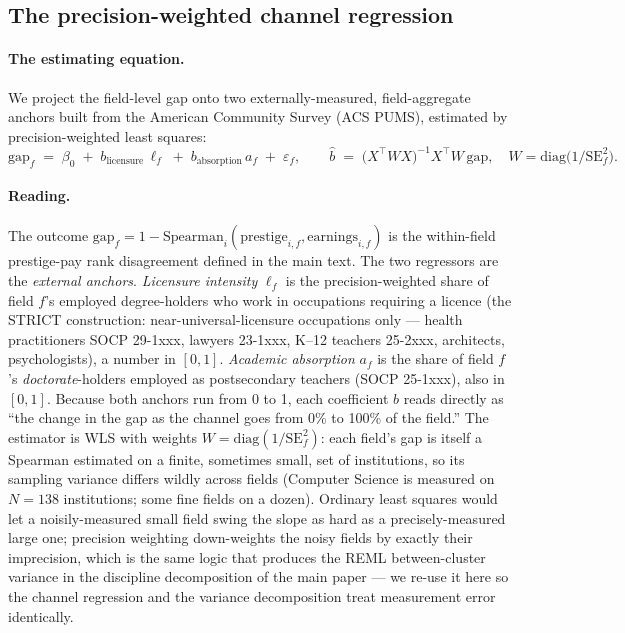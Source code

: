 \documentclass[11pt]{article}
\begin{document}
\subsection{The precision-weighted channel regression}

\paragraph{The estimating equation.} We project the field-level gap onto two externally-measured, field-aggregate anchors built from the American Community Survey (ACS PUMS), estimated by precision-weighted least squares:
\[
\mathrm{gap}_f \;=\; \beta_0 \;+\; b_{\text{licensure}}\,\ell_f \;+\; b_{\text{absorption}}\,a_f \;+\; \varepsilon_f,
\qquad
\widehat{b} \;=\; \big(X^\top W X\big)^{-1} X^\top W\,\mathrm{gap},
\quad
W = \mathrm{diag}\!\big(1/\mathrm{SE}_f^2\big).
\]

\paragraph{Reading.} The outcome $\mathrm{gap}_f = 1 - \mathrm{Spearman}_i(\text{prestige}_{i,f},\text{earnings}_{i,f})$ is the within-field prestige-pay rank disagreement defined in the main text. The two regressors are the \emph{external anchors}. \emph{Licensure intensity} $\ell_f$ is the precision-weighted share of field $f$'s employed degree-holders who work in occupations requiring a licence (the STRICT construction: near-universal-licensure occupations only --- health practitioners SOCP 29-1xxx, lawyers 23-1xxx, K--12 teachers 25-2xxx, architects, psychologists), a number in $[0,1]$. \emph{Academic absorption} $a_f$ is the share of field $f$'s \emph{doctorate}-holders employed as postsecondary teachers (SOCP 25-1xxx), also in $[0,1]$. Because both anchors run from 0 to 1, each coefficient $b$ reads directly as ``the change in the gap as the channel goes from 0\% to 100\% of the field.'' The estimator is WLS with weights $W=\mathrm{diag}(1/\mathrm{SE}_f^2)$: each field's gap is itself a Spearman estimated on a finite, sometimes small, set of institutions, so its sampling variance differs wildly across fields (Computer Science is measured on $N{=}138$ institutions; some fine fields on a dozen). Ordinary least squares would let a noisily-measured small field swing the slope as hard as a precisely-measured large one; precision weighting down-weights the noisy fields by exactly their imprecision, which is the same logic that produces the REML between-cluster variance in the discipline decomposition of the main paper --- we re-use it here so the channel regression and the variance decomposition treat measurement error identically.
\end{document}

